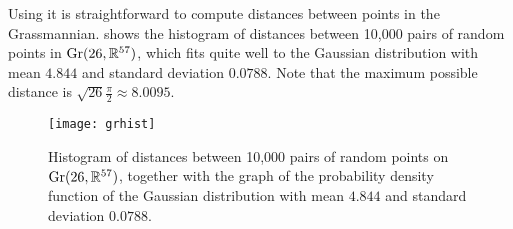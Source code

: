 \begin{example}
	
	Using  it is straightforward to compute distances between points in the Grassmannian.  shows the histogram of distances between 10,000 pairs of random points in $\operatorname{Gr}(26,\mathbb{R}^{57})$, which fits quite well to the Gaussian distribution with mean $4.844$ and standard deviation $0.0788$. Note that the maximum possible distance is $\sqrt{26}\frac{\pi}{2}\approx 8.0095$.
	
	\begin{figure}[htbp]
		\centering
			\texttt{[image: grhist]}
		\caption{Histogram of distances between 10,000 pairs of random points on $\operatorname{Gr}(26,\mathbb{R}^{57})$, together with the graph of the probability density function of the Gaussian distribution with mean $4.844$ and standard deviation $0.0788$.}
		\label{fig:grassmannian distance histogram}
	\end{figure}
\end{example}